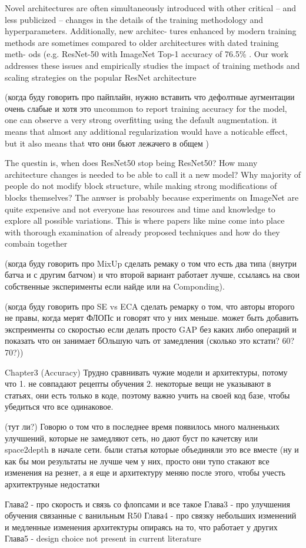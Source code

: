 Novel architectures are often simultaneously introduced with other critical – and less publicized – changes in the details of the training methodology and hyperparameters. Additionally, new architec- tures enhanced by modern training methods are sometimes compared to older architectures with dated training meth- ods (e.g. ResNet-50 with ImageNet Top-1 accuracy of 76.5\% \cite{he2016deep_resnetv2}. Our work addresses these issues and empirically studies the impact of training methods and scaling strategies on the popular ResNet architecture


(когда буду говорить про пайплайн, нужно вставить что дефолтные аугментации очень слабые и хотя это uncommon to report training accuracy for the model, one can observe a very strong overfitting using the default augmentation. it means that almost any additional regularization would have a noticable effect, but it also means that что они бьют лежачего в общем    )


The questin is, when does ResNet50 stop being ResNet50? How many architecture changes is needed to be able to call it a new model? Why majority of people do not modify block structure, while making strong modifications of blocks themselves? The anwser is probably because experiments on ImageNet are quite expensive and not everyone has resources and time and knowledge to explore all possible variations. This is where papers like mine come into place with thorough examination of already proposed techniques and how do they combain together


(когда буду говорить про MixUp сделать ремаку о том что есть два типа (внутри батча и с другим батчом) и что второй вариант работает лучше, ссылаясь на свои собственные эксперименты если найде или на Componding). 


(когда буду говорить про SE vs ECA сделать ремарку о том, что авторы второго не правы, когда мерят ФЛОПс и говорят что у них меньше. может быть добавить экспреименты со скоростью если делать просто GAP без каких либо операций и показать что он занимает бОльшую чать от замедления (сколько это кстати? 60? 70?))


Chapter3 (Accuracy)
Трудно сравнивать чужие модели и архитектуры, потому что 1. не совпадают рецепты обучения 2. некоторые вещи не указывают в статьях, они есть только в коде, поэтому важно учить на своей код базе, чтобы убедиться что все одинаковое. 

(тут ли?)
Говорю о том что в последнее время появилось много малненьких улучшений, которые не замедляют сеть, но дают буст по качетсву \cite{zhang2019making_aa_shift_invariant} или space2depth  \cite{ridnik2021_tresnet} в начале сети. были статья которые объединяли это все вместе \cite{lee2020compounding_improvements} \cite{bello2021revisiting_resnet} (ну и как бы мои результаты не лучше чем у них, просто они тупо стакают все изменения на резнет, а я еще и архитектуру меняю после этого, чтобы учесть архитектруные недостатки


Глава2 - про скорость и связь со флопсами и все такое
Глава3 - про улучшения обучения связанные с ванильным R50
Глава4 - про связку небольших изменений и медленные изменения архитектуры опираясь на то, что работает у других
Глава5 - design choice not present in current literature

